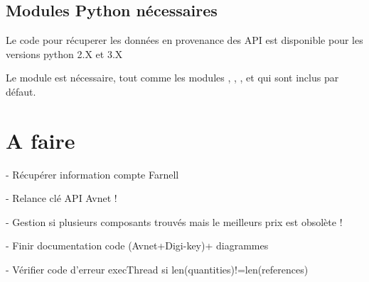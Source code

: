 \section{Modules Python nécessaires}

Le code pour récuperer les données en provenance des API est disponible pour les versions python 2.X et 3.X

Le module  est nécessaire, tout comme les modules 
, , ,  et  qui sont inclus par défaut.

\chapter{A faire}


- Récupérer information compte Farnell 

- Relance clé API Avnet !

- Gestion si plusieurs composants trouvés mais le meilleurs prix est obsolète !

- Finir documentation code (Avnet+Digi-key)+ diagrammes

- Vérifier code d'erreur execThread si len(quantities)!=len(references)
